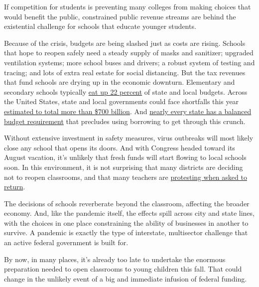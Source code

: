 If competition for students is preventing many colleges from making
choices that would benefit the public, constrained public revenue
streams are behind the existential challenge for schools that educate
younger students.

Because of the crisis, budgets are being slashed just as costs are
rising. Schools that hope to reopen safely need a steady supply of masks
and sanitizer; upgraded ventilation systems; more school buses and
drivers; a robust system of testing and tracing; and lots of extra real
estate for social distancing. But the tax revenues that fund schools are
drying up in the economic downturn. Elementary and secondary schools
typically
\href{https://www.pgpf.org/blog/2020/07/pandemic-budget-crunch-could-force-states-to-slash-social-services-education-police-budgets-and-more}{eat
up 22 percent} of state and local budgets. Across the United States,
state and local governments could face shortfalls this year
\href{https://www.forbes.com/sites/lizfarmer/2020/07/14/trump-cant-withhold-education-funding-but-schools-could-face-a-funding-crisis-anyway/\#_blank}{estimated
to total more than \$700 billion}. And
\href{https://www.pgpf.org/blog/2020/07/pandemic-budget-crunch-could-force-states-to-slash-social-services-education-police-budgets-and-more}{nearly
every state has a balanced budget requirement} that precludes using
borrowing to get through this crunch.

Without extensive investment in safety measures, virus outbreaks will
most likely close any school that opens its doors. And with Congress
headed toward its August vacation, it's unlikely that fresh funds will
start flowing to local schools soon. In this environment, it is not
surprising that many districts are deciding not to reopen classrooms,
and that many teachers are
\href{https://www.nytimes3xbfgragh.onion/2020/07/29/us/teacher-union-school-reopening-coronavirus.html?searchResultPosition=1}{protesting
when asked to return}.

The decisions of schools reverberate beyond the classroom, affecting the
broader economy. And, like the pandemic itself, the effects spill across
city and state lines, with the choices in one place constraining the
ability of businesses in another to survive. A pandemic is exactly the
type of interstate, multisector challenge that an active federal
government is built for.

By now, in many places, it's already too late to undertake the enormous
preparation needed to open classrooms to young children this fall. That
could change in the unlikely event of a big and immediate infusion of
federal funding.

